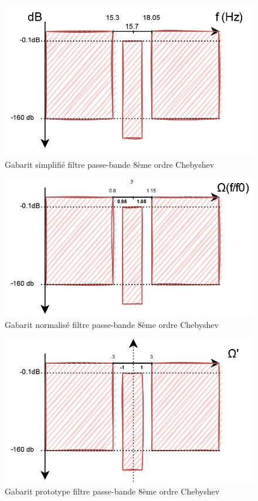 \begin{itemize}
    \begin{figure}[!htbp]
      \centering
      \includegraphics[scale=0.40]{img/passe_bande_simplifie.png}
      \caption{Gabarit simplifié filtre passe-bande 8ème ordre Chebyshev}
      \label{fig:boat1}
    \end{figure}
    \FloatBarrier
    \begin{figure}[!htbp]
      \centering
      \includegraphics[scale=0.40]{img/passe_bande_normalise.png}
      \caption{Gabarit normalisé filtre passe-bande 8ème ordre Chebyshev}
      \label{fig:boat1}
    \end{figure}
    \FloatBarrier
    \begin{figure}[!htbp]
      \centering
      \includegraphics[scale=0.40]{img/passe_bande_prototype.png}
      \caption{Gabarit prototype filtre passe-bande 8ème ordre Chebyshev}
      \label{fig:boat1}
    \end{figure}
    \FloatBarrier
    

\end{itemize}
